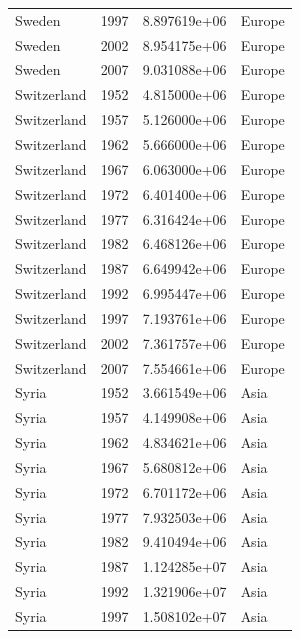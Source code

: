 \documentclass[
  letterpaper,
  DIV=11,
  numbers=noendperiod]{scrreprt}
\begin{document}
\begin{tcolorbox}
\begin{tabular}{lrrl}
Sweden                   &  1997 &  8.897619e+06 &    Europe \\
Sweden                   &  2002 &  8.954175e+06 &    Europe \\
Sweden                   &  2007 &  9.031088e+06 &    Europe \\
Switzerland              &  1952 &  4.815000e+06 &    Europe \\
Switzerland              &  1957 &  5.126000e+06 &    Europe \\
Switzerland              &  1962 &  5.666000e+06 &    Europe \\
Switzerland              &  1967 &  6.063000e+06 &    Europe \\
Switzerland              &  1972 &  6.401400e+06 &    Europe \\
Switzerland              &  1977 &  6.316424e+06 &    Europe \\
Switzerland              &  1982 &  6.468126e+06 &    Europe \\
Switzerland              &  1987 &  6.649942e+06 &    Europe \\
Switzerland              &  1992 &  6.995447e+06 &    Europe \\
Switzerland              &  1997 &  7.193761e+06 &    Europe \\
Switzerland              &  2002 &  7.361757e+06 &    Europe \\
Switzerland              &  2007 &  7.554661e+06 &    Europe \\
Syria                    &  1952 &  3.661549e+06 &      Asia \\
Syria                    &  1957 &  4.149908e+06 &      Asia \\
Syria                    &  1962 &  4.834621e+06 &      Asia \\
Syria                    &  1967 &  5.680812e+06 &      Asia \\
Syria                    &  1972 &  6.701172e+06 &      Asia \\
Syria                    &  1977 &  7.932503e+06 &      Asia \\
Syria                    &  1982 &  9.410494e+06 &      Asia \\
Syria                    &  1987 &  1.124285e+07 &      Asia \\
Syria                    &  1992 &  1.321906e+07 &      Asia \\
Syria                    &  1997 &  1.508102e+07 &      Asia \\

\end{tabular}
\end{tcolorbox}
\end{document}
